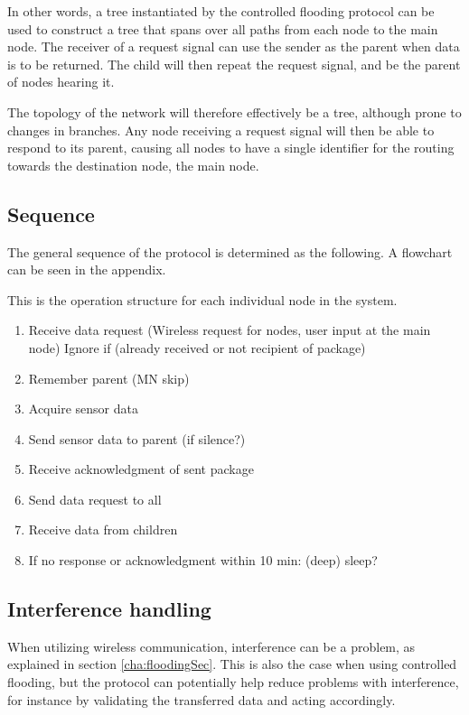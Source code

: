 In other words, a tree instantiated by the controlled flooding protocol can be used to construct a tree that spans over all paths from each node to the main node.
The receiver of a request signal can use the sender as the parent when data is to be returned.
The child will then repeat the request signal, and be the parent of nodes hearing it.

The topology of the network will therefore effectively be a tree, although prone to changes in branches.
Any node receiving a request signal will then be able to respond to its parent, causing all nodes to have a single identifier for the routing towards the destination node, the main node.

\subsection{Sequence}
The general sequence of the protocol is determined as the following. A flowchart can be seen in the appendix.

This is the operation structure for each individual node in the system.
\begin{enumerate}
	\item Receive data request (Wireless request for nodes, user input at the main node)
	\subitem Ignore if (already received or not recipient of package)
	\item Remember parent (MN skip)
	\item Acquire sensor data
	\item Send sensor data to parent (if silence?)
	\item Receive acknowledgment of sent package
	\item Send data request to all
	\item Receive data from children
	\item If no response or acknowledgment within 10 min: (deep) sleep?
\end{enumerate}

\subsection{Interference handling} \label{cha:crcDesign}
When utilizing wireless communication, interference can be a problem, as explained in section \ref{cha:floodingSec}. This is also the case when using controlled flooding, but the protocol can potentially help reduce problems with interference, for instance by validating the transferred data and acting accordingly.

